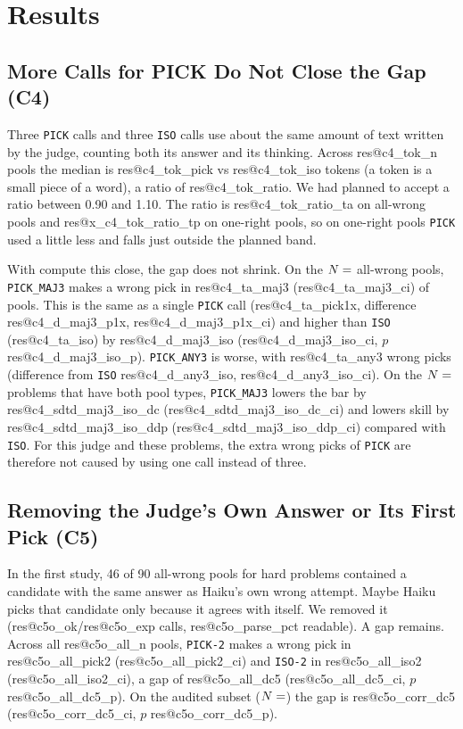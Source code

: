 \documentclass[10pt,twocolumn]{article}
\makeatletter
\newcommand{\res}[1]{\csname res@#1\endcsname}
\makeatother
\begin{document}
\section{Results}

\subsection{More Calls for PICK Do Not Close the Gap (C4)}
Three \texttt{PICK} calls and three \texttt{ISO} calls use about the same amount of text written by the judge, counting both its answer and its thinking. Across \res{c4_tok_n} pools the median is \res{c4_tok_pick} vs \res{c4_tok_iso} tokens (a token is a small piece of a word), a ratio of \res{c4_tok_ratio}. We had planned to accept a ratio between 0.90 and 1.10. The ratio is \res{c4_tok_ratio_ta} on all-wrong pools and \res{x_c4_tok_ratio_tp} on one-right pools, so on one-right pools \texttt{PICK} used a little less and falls just outside the planned band.

With compute this close, the gap does not shrink. On the $N=\res{c4_n_ta}$ all-wrong pools, \texttt{PICK\_MAJ3} makes a wrong pick in \res{c4_ta_maj3} (\res{c4_ta_maj3_ci}) of pools. This is the same as a single \texttt{PICK} call (\res{c4_ta_pick1x}, difference \res{c4_d_maj3_p1x}, \res{c4_d_maj3_p1x_ci}) and higher than \texttt{ISO} (\res{c4_ta_iso}) by \res{c4_d_maj3_iso} (\res{c4_d_maj3_iso_ci}, $p$ \res{c4_d_maj3_iso_p}). \texttt{PICK\_ANY3} is worse, with \res{c4_ta_any3} wrong picks (difference from \texttt{ISO} \res{c4_d_any3_iso}, \res{c4_d_any3_iso_ci}). On the $N=\res{c4_n_tp}$ problems that have both pool types, \texttt{PICK\_MAJ3} lowers the bar by \res{c4_sdtd_maj3_iso_dc} (\res{c4_sdtd_maj3_iso_dc_ci}) and lowers skill by \res{c4_sdtd_maj3_iso_ddp} (\res{c4_sdtd_maj3_iso_ddp_ci}) compared with \texttt{ISO}. For this judge and these problems, the extra wrong picks of \texttt{PICK} are therefore not caused by using one call instead of three.

\subsection{Removing the Judge's Own Answer or Its First Pick (C5)}
In the first study, 46 of 90 all-wrong pools for hard problems contained a candidate with the same answer as Haiku's own wrong attempt. Maybe Haiku picks that candidate only because it agrees with itself. We removed it (\res{c5o_ok}/\res{c5o_exp} calls, \res{c5o_parse_pct} readable). A gap remains. Across all \res{c5o_all_n} pools, \texttt{PICK-2} makes a wrong pick in \res{c5o_all_pick2} (\res{c5o_all_pick2_ci}) and \texttt{ISO-2} in \res{c5o_all_iso2} (\res{c5o_all_iso2_ci}), a gap of \res{c5o_all_dc5} (\res{c5o_all_dc5_ci}, $p$ \res{c5o_all_dc5_p}). On the audited subset ($N=\res{c5o_corr_n}$) the gap is \res{c5o_corr_dc5} (\res{c5o_corr_dc5_ci}, $p$ \res{c5o_corr_dc5_p}).
\end{document}
